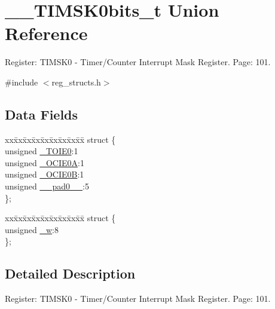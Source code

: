 \hypertarget{union_____t_i_m_s_k0bits__t}{\section{\+\_\+\+\_\+\+T\+I\+M\+S\+K0bits\+\_\+t Union Reference}
\label{union_____t_i_m_s_k0bits__t}
}


Register\+: T\+I\+M\+S\+K0 -\/ Timer/\+Counter Interrupt Mask Register. Page\+: 101.  




{\ttfamily \#include $<$reg\+\_\+structs.\+h$>$}

\subsection*{Data Fields}
\begin{DoxyCompactItemize}
\item 
\begin{tabbing}
xx\=xx\=xx\=xx\=xx\=xx\=xx\=xx\=xx\=\kill
struct \{\\
\>unsigned \hyperlink{union_____t_i_m_s_k0bits__t_a324d02df4480383ae3a9863edd479ed3}{\_TOIE0}:1\\
\>unsigned \hyperlink{union_____t_i_m_s_k0bits__t_a105935bb5c78017c8481ee347600511b}{\_OCIE0A}:1\\
\>unsigned \hyperlink{union_____t_i_m_s_k0bits__t_a6e63954cfe1eaedde9ce1d61d64e4d61}{\_OCIE0B}:1\\
\>unsigned \hyperlink{union_____t_i_m_s_k0bits__t_add3d2200d86c2dcc9f267f32e1a6568e}{\_\_pad0\_\_}:5\\
\}; \\

\end{tabbing}\item 
\begin{tabbing}
xx\=xx\=xx\=xx\=xx\=xx\=xx\=xx\=xx\=\kill
struct \{\\
\>unsigned \hyperlink{union_____t_i_m_s_k0bits__t_a03c5af0ecd57a12c9d94b19451d2b6c8}{\_w}:8\\
\}; \\

\end{tabbing}\end{DoxyCompactItemize}


\subsection{Detailed Description}
Register\+: T\+I\+M\+S\+K0 -\/ Timer/\+Counter Interrupt Mask Register. Page\+: 101. 

